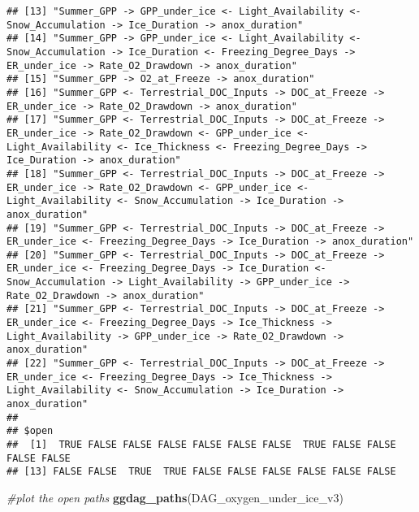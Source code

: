 \documentclass[]{article}
\newenvironment{Shaded}{\begin{snugshade}}{\end{snugshade}}
\newcommand{\CommentTok}[1]{\textcolor[rgb]{0.56,0.35,0.01}{\textit{#1}}}
\newcommand{\KeywordTok}[1]{\textcolor[rgb]{0.13,0.29,0.53}{\textbf{#1}}}
\newcommand{\NormalTok}[1]{#1}
\begin{document}
\begin{verbatim}
## [13] "Summer_GPP -> GPP_under_ice <- Light_Availability <- Snow_Accumulation -> Ice_Duration -> anox_duration"                                                                                                       
## [14] "Summer_GPP -> GPP_under_ice <- Light_Availability <- Snow_Accumulation -> Ice_Duration <- Freezing_Degree_Days -> ER_under_ice -> Rate_O2_Drawdown -> anox_duration"                                           
## [15] "Summer_GPP -> O2_at_Freeze -> anox_duration"                                                                                                                                                                   
## [16] "Summer_GPP <- Terrestrial_DOC_Inputs -> DOC_at_Freeze -> ER_under_ice -> Rate_O2_Drawdown -> anox_duration"                                                                                                    
## [17] "Summer_GPP <- Terrestrial_DOC_Inputs -> DOC_at_Freeze -> ER_under_ice -> Rate_O2_Drawdown <- GPP_under_ice <- Light_Availability <- Ice_Thickness <- Freezing_Degree_Days -> Ice_Duration -> anox_duration"    
## [18] "Summer_GPP <- Terrestrial_DOC_Inputs -> DOC_at_Freeze -> ER_under_ice -> Rate_O2_Drawdown <- GPP_under_ice <- Light_Availability <- Snow_Accumulation -> Ice_Duration -> anox_duration"                        
## [19] "Summer_GPP <- Terrestrial_DOC_Inputs -> DOC_at_Freeze -> ER_under_ice <- Freezing_Degree_Days -> Ice_Duration -> anox_duration"                                                                                
## [20] "Summer_GPP <- Terrestrial_DOC_Inputs -> DOC_at_Freeze -> ER_under_ice <- Freezing_Degree_Days -> Ice_Duration <- Snow_Accumulation -> Light_Availability -> GPP_under_ice -> Rate_O2_Drawdown -> anox_duration"
## [21] "Summer_GPP <- Terrestrial_DOC_Inputs -> DOC_at_Freeze -> ER_under_ice <- Freezing_Degree_Days -> Ice_Thickness -> Light_Availability -> GPP_under_ice -> Rate_O2_Drawdown -> anox_duration"                    
## [22] "Summer_GPP <- Terrestrial_DOC_Inputs -> DOC_at_Freeze -> ER_under_ice <- Freezing_Degree_Days -> Ice_Thickness -> Light_Availability <- Snow_Accumulation -> Ice_Duration -> anox_duration"                    
## 
## $open
##  [1]  TRUE FALSE FALSE FALSE FALSE FALSE FALSE  TRUE FALSE FALSE FALSE FALSE
## [13] FALSE FALSE  TRUE  TRUE FALSE FALSE FALSE FALSE FALSE FALSE
\end{verbatim}

\begin{Shaded}
\begin{Highlighting}[]
\CommentTok{#plot the open  paths }
\KeywordTok{ggdag_paths}\NormalTok{(DAG_oxygen_under_ice_v3)}
\end{Highlighting}
\end{Shaded}
\end{document}
